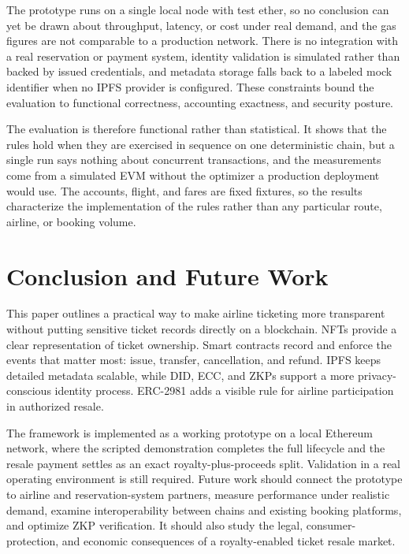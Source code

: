 \documentclass[conference]{IEEEtran}
\begin{document}
The prototype runs on a single local node with test ether, so no conclusion can yet be drawn about throughput, latency, or cost under real demand, and the gas figures are not comparable to a production network. There is no integration with a real reservation or payment system, identity validation is simulated rather than backed by issued credentials, and metadata storage falls back to a labeled mock identifier when no IPFS provider is configured. These constraints bound the evaluation to functional correctness, accounting exactness, and security posture.

The evaluation is therefore functional rather than statistical. It shows that the rules hold when they are exercised in sequence on one deterministic chain, but a single run says nothing about concurrent transactions, and the measurements come from a simulated EVM without the optimizer a production deployment would use. The accounts, flight, and fares are fixed fixtures, so the results characterize the implementation of the rules rather than any particular route, airline, or booking volume.

\section{Conclusion and Future Work}
This paper outlines a practical way to make airline ticketing more transparent without putting sensitive ticket records directly on a blockchain. NFTs provide a clear representation of ticket ownership. Smart contracts record and enforce the events that matter most: issue, transfer, cancellation, and refund. IPFS keeps detailed metadata scalable, while DID, ECC, and ZKPs support a more privacy-conscious identity process. ERC-2981 adds a visible rule for airline participation in authorized resale.

The framework is implemented as a working prototype on a local Ethereum network, where the scripted demonstration completes the full lifecycle and the resale payment settles as an exact royalty-plus-proceeds split. Validation in a real operating environment is still required. Future work should connect the prototype to airline and reservation-system partners, measure performance under realistic demand, examine interoperability between chains and existing booking platforms, and optimize ZKP verification. It should also study the legal, consumer-protection, and economic consequences of a royalty-enabled ticket resale market.
\end{document}
